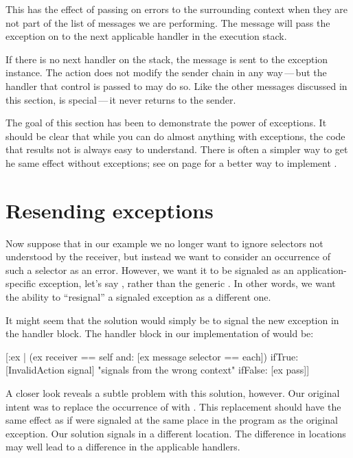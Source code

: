 \documentclass[a4paper,10pt,twoside]{book}
\begin{document}
This has the effect of passing on  errors to the surrounding context when they are not part of the list of messages we are performing. The  message will pass the exception on to the next applicable handler in the execution stack.

If there is no next handler on the stack, the  message is sent to the exception instance. The  action does not modify the sender chain in any way\,---\,but the handler that control is passed to may do so. Like the other messages discussed in this section,  is special\,---\,it never returns to the sender.

The goal of this section has been to demonstrate the power of exceptions.
It should be clear that while you can do almost anything with exceptions, the code
that results not is always easy to understand.   
There is often a simpler way to get he same effect without exceptions; see  on page \pageref{mth:simplerObjectPerfromAll} for a better way to implement .

\section{Resending exceptions}

Now suppose that in our  example we no longer want to ignore selectors not understood by the receiver, but instead we want to consider an occurrence of such a selector as an error. However, we want it to be signaled as an application-specific exception, let's say , rather than the generic . In other words, we want the ability to ``resignal'' a signaled exception as a different one.

It might seem that the solution would simply be to signal the new exception in the handler block. The handler block in our implementation of  would be:

\begin{code}{}
[:ex | (ex receiver == self and: [ex message selector == each])
	ifTrue: [InvalidAction signal]    "signals from the wrong context"
	ifFalse: [ex pass]]
\end{code}

A closer look reveals a subtle problem with this solution, however. Our original intent was to replace the occurrence of  with . This replacement should have the same effect as if  were signaled at the same place in the program as the original  exception. Our solution signals  in a different location. The difference in locations may well lead to a difference in the applicable handlers.
\end{document}
